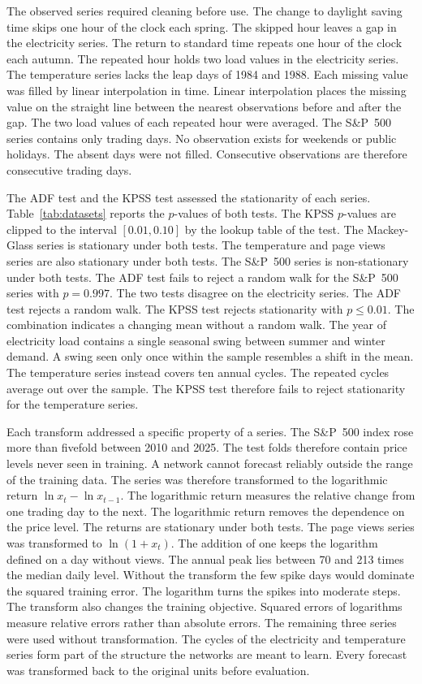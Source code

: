 \documentclass[conference,10pt]{IEEEtran}
\begin{document}
The observed series required cleaning before use.
The change to daylight saving time skips one hour of the clock each
spring.
The skipped hour leaves a gap in the electricity series.
The return to standard time repeats one hour of the clock each autumn.
The repeated hour holds two load values in the electricity series.
The temperature series lacks the leap days of 1984 and 1988.
Each missing value was filled by linear interpolation in time.
Linear interpolation places the missing value on the straight line
between the nearest observations before and after the gap.
The two load values of each repeated hour were averaged.
The S\&P~500 series contains only trading days.
No observation exists for weekends or public holidays.
The absent days were not filled.
Consecutive observations are therefore consecutive trading days.

The ADF test and the KPSS test assessed the stationarity of each series.
Table~\ref{tab:datasets} reports the $p$-values of both tests.
The KPSS $p$-values are clipped to the interval $[0.01, 0.10]$ by the
lookup table of the test.
The Mackey-Glass series is stationary under both tests.
The temperature and page views series are also stationary under both
tests.
The S\&P~500 series is non-stationary under both tests.
The ADF test fails to reject a random walk for the S\&P~500 series with
$p = 0.997$.
The two tests disagree on the electricity series.
The ADF test rejects a random walk.
The KPSS test rejects stationarity with $p \leq 0.01$.
The combination indicates a changing mean without a random walk.
The year of electricity load contains a single seasonal swing between
summer and winter demand.
A swing seen only once within the sample resembles a shift in the mean.
The temperature series instead covers ten annual cycles.
The repeated cycles average out over the sample.
The KPSS test therefore fails to reject stationarity for the
temperature series.

Each transform addressed a specific property of a series.
The S\&P~500 index rose more than fivefold between 2010 and 2025.
The test folds therefore contain price levels never seen in training.
A network cannot forecast reliably outside the range of the training
data.
The series was therefore transformed to the logarithmic return
$\ln x_t - \ln x_{t-1}$.
The logarithmic return measures the relative change from one trading
day to the next.
The logarithmic return removes the dependence on the price level.
The returns are stationary under both tests.
The page views series was transformed to $\ln(1 + x_t)$.
The addition of one keeps the logarithm defined on a day without views.
The annual peak lies between 70 and 213 times the median daily level.
Without the transform the few spike days would dominate the squared
training error.
The logarithm turns the spikes into moderate steps.
The transform also changes the training objective.
Squared errors of logarithms measure relative errors rather than
absolute errors.
The remaining three series were used without transformation.
The cycles of the electricity and temperature series form part of the
structure the networks are meant to learn.
Every forecast was transformed back to the original units before
evaluation.
\end{document}
